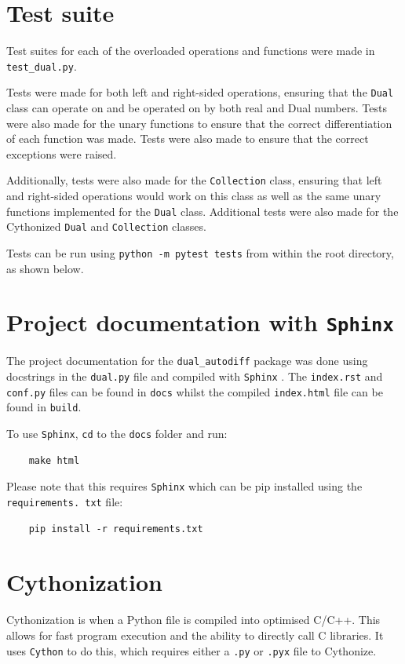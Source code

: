 \documentclass[11pt,a4paper]{article}
\begin{document}
\section{Test suite}
Test suites for each of the overloaded operations and functions were made in \texttt{test\_dual.py}.

Tests were made for both left and right-sided operations, ensuring that the \texttt{Dual} class can operate on and be operated on by both real and Dual numbers. Tests were also made for the unary functions to ensure that the correct differentiation of each function was made. Tests were also made to ensure that the correct exceptions were raised. 

Additionally, tests were also made for the \texttt{Collection} class, ensuring that left and right-sided operations would work on this class as well as the same unary functions implemented for the \texttt{Dual} class. Additional tests were also made for the Cythonized \texttt{Dual} and \texttt{Collection} classes.

Tests can be run using \texttt{python -m pytest tests} from within the root directory, as shown below.


\section{Project documentation with \texttt{\textbf{Sphinx}}}
The project documentation for the \texttt{dual\_autodiff} package was done using docstrings in the \texttt{dual.py} file and compiled with \texttt{Sphinx} \citep{brandl2021sphinx}. The \texttt{index.rst} and \texttt{conf.py} files can be found in \texttt{docs} whilst the compiled \texttt{index.html} file can be found in \texttt{build}.

To use \texttt{Sphinx}, \texttt{cd} to the \texttt{docs} folder and run:

\begin{lstlisting}
    make html
\end{lstlisting}

Please note that this requires \texttt{Sphinx} which can be pip installed using the \texttt{requirements. txt} file:

\begin{lstlisting}
    pip install -r requirements.txt
\end{lstlisting}
\section{Cythonization}
Cythonization \citep{behnel2011cython} is when a Python file is compiled into optimised C/C++. This allows for fast program execution and the ability to directly call C libraries. It uses \texttt{Cython} to do this, which requires either a \texttt{.py} or \texttt{.pyx} file to Cythonize.
\end{document}
